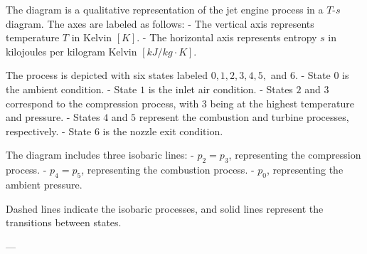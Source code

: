The diagram is a qualitative representation of the jet engine process in a \( T \)-\( s \) diagram. The axes are labeled as follows:  
- The vertical axis represents temperature \( T \) in Kelvin \([K]\).  
- The horizontal axis represents entropy \( s \) in kilojoules per kilogram Kelvin \([kJ/kg·K]\).  

The process is depicted with six states labeled \( 0, 1, 2, 3, 4, 5, \) and \( 6 \).  
- State \( 0 \) is the ambient condition.  
- State \( 1 \) is the inlet air condition.  
- States \( 2 \) and \( 3 \) correspond to the compression process, with \( 3 \) being at the highest temperature and pressure.  
- States \( 4 \) and \( 5 \) represent the combustion and turbine processes, respectively.  
- State \( 6 \) is the nozzle exit condition.  

The diagram includes three isobaric lines:  
- \( p_2 = p_3 \), representing the compression process.  
- \( p_4 = p_5 \), representing the combustion process.  
- \( p_0 \), representing the ambient pressure.  

Dashed lines indicate the isobaric processes, and solid lines represent the transitions between states.

---